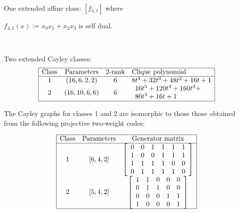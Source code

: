 \documentclass[12pt,a4paper]{article}
\begin{document}
One extended affine class: $[f_{4,1}]$ where

$f_{4,1}(x) := x_0 x_1 + x_2 x_3$ is self dual.

~

Two extended Cayley classes:
\begin{align*}
\begin{array}{|cccl|}
\hline
\text{Class} &
\text{Parameters} &
\text{2-rank} &
\text{Clique polynomial}
\\
\hline
1 &
(16, 6, 2, 2) &
6 &
8t^{4} + 32t^{3} + 48t^{2} + 16t + 1
\\
2 &
(16, 10, 6, 6) &
6 &
\begin{array}{l}
16t^{5} + 120t^{4} + 160t^{3} +
\\
80t^{2} + 16t + 1
\end{array}
\\
\hline
\end{array}
\end{align*}

The Cayley graphs for classes 1 and 2 are isomorphic to those those obtained from the following
projective two-weight codes:

\begin{align*}
\begin{array}{|ccc|}
\hline
\text{Class} &
\text{Parameters} & \text{Generator matrix}
\\
\hline
1 &
[6, 4, 2] &
\left[
\begin{array}{cccccc}
0 & 0 & 1 & 1 & 1 & 1
\\
1 & 0 & 0 & 1 & 1 & 1
\\
1 & 1 & 1 & 1 & 0 & 0
\\
0 & 1 & 1 & 1 & 1 & 0
\end{array}
\right]
\\
2 &
[5, 4, 2] &
\left[
\begin{array}{ccccc}
1 & 1 & 0 & 0 & 0
\\
0 & 1 & 1 & 0 & 0
\\
0 & 0 & 0 & 1 & 1
\\
1 & 0 & 0 & 0 & 1
\end{array}
\right]
\\
\hline
\end{array}
\end{align*}
\end{document}
